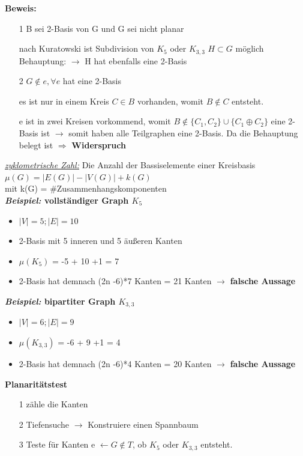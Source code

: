 \textbf{Beweis:}
\begin{itemize}
	\item[1] B sei 2-Basis von G und G sei nicht planar 
	\item[] nach Kuratowski ist Subdivision von $K_5$ oder $K_{3,3}$ $H \subset G$ möglich \newline Behauptung: $\rightarrow$ H hat ebenfalls eine 2-Basis \newline
	
	\item[2] $G \notin e, \forall e$ hat eine 2-Basis
	\item[] es ist nur in einem Kreis $C \in B$ vorhanden, womit $B \notin C$ entsteht.
	\item[] e ist in zwei Kreisen vorkommend, womit $B \notin \{C_1, C_2\} \cup \{ C_1 \oplus C_2\}$ eine 2-Basis ist \newline $\rightarrow$ somit haben alle Teilgraphen eine 2-Basis. Da die Behauptung belegt ist $\Rightarrow$ \textbf{Widerspruch}
\end{itemize}
\textit{\underline{zyklometrische Zahl:}} Die Anzahl der Bassiselemente einer Kreisbasis\\
$\mu(G)=|E(G)| - |V(G)| + k(G)$\\
mit k(G) = \#Zusammenhangskomponenten
\\
\newline
\textbf{\textit{Beispiel:} vollständiger Graph $K_5$}
\begin{itemize}
	\item $|V| = 5 ; |E| = 10$
	\item 2-Basis mit 5 inneren und 5 äußeren Kanten
	\item $\mu(K_5)$ = -5 + 10 +1 = 7
	\item 2-Basis hat demnach (2n -6)*7 Kanten = 21 Kanten $\rightarrow$ \newline \textbf{falsche Aussage}
\end{itemize}	
\textbf{\textit{Beispiel:} bipartiter Graph $K_{3,3}$}
\begin{itemize}
	\item $|V| = 6 ; |E| = 9$
	\item $\mu(K_{3,3})$ = -6 + 9 +1 = 4
	\item 2-Basis hat demnach (2n -6)*4 Kanten = 20 Kanten $\rightarrow$ \newline \textbf{falsche Aussage}
\end{itemize}
\textbf{Planaritätstest}
\begin{itemize}
	\item[1] zähle die Kanten 
	\item[2] Tiefensuche $\rightarrow$ Konstruiere einen Spannbaum
	\item[3] Teste für Kanten e $\leftarrow G \notin T$, ob $K_5$ oder $K_{3,3}$ entsteht.
\end{itemize}
